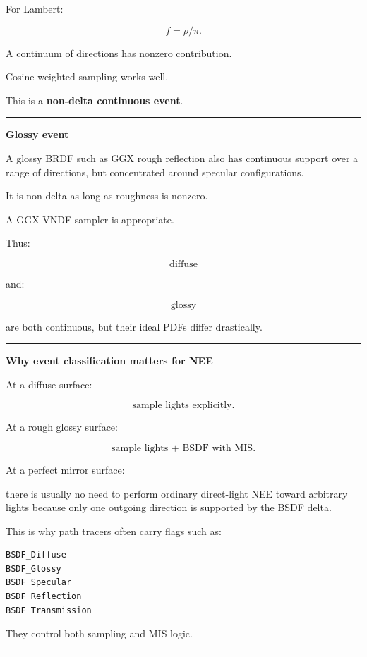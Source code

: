 For Lambert:

\[
f=\rho/\pi.
\]

A continuum of directions has nonzero contribution.

Cosine-weighted sampling works well.

This is a \textbf{non-delta continuous event}.

\begin{center}\rule{0.5\linewidth}{0.5pt}\end{center}

\textbf{Glossy event}

A glossy BRDF such as GGX rough reflection also has continuous support over a range of directions, but concentrated around specular configurations.

It is non-delta as long as roughness is nonzero.

A GGX VNDF sampler is appropriate.

Thus:

\[
\text{diffuse}
\]

and:

\[
\text{glossy}
\]

are both continuous, but their ideal PDFs differ drastically.

\begin{center}\rule{0.5\linewidth}{0.5pt}\end{center}

\textbf{Why event classification matters for NEE}

At a diffuse surface:

\[
\text{sample lights explicitly}.
\]

At a rough glossy surface:

\[
\text{sample lights + BSDF with MIS}.
\]

At a perfect mirror surface:

there is usually no need to perform ordinary direct-light NEE toward arbitrary lights because only one outgoing direction is supported by the BSDF delta.

This is why path tracers often carry flags such as:

\begin{verbatim}
BSDF_Diffuse
BSDF_Glossy
BSDF_Specular
BSDF_Reflection
BSDF_Transmission
\end{verbatim}

They control both sampling and MIS logic.

\begin{center}\rule{0.5\linewidth}{0.5pt}\end{center}


